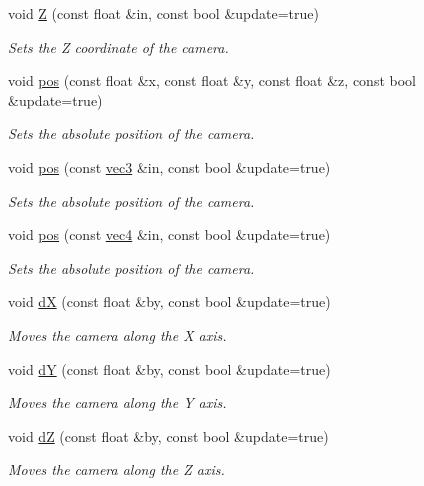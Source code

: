 \begin{DoxyCompactItemize}
void \hyperlink{class_camera_a38438f8e2417a3a40eaad85d2ab344a9}{\-Z} (const float \&in, const bool \&update=true)
\begin{DoxyCompactList}\small\item\em \-Sets the \-Z coordinate of the camera. \end{DoxyCompactList}\item 
void \hyperlink{class_camera_a432e03c15d63f8839fe4731016d907a4}{pos} (const float \&x, const float \&y, const float \&z, const bool \&update=true)
\begin{DoxyCompactList}\small\item\em \-Sets the absolute position of the camera. \end{DoxyCompactList}\item 
void \hyperlink{class_camera_ae9dc2206b71b25cf320a05d148cb8b56}{pos} (const \hyperlink{struct_angel_1_1vec3}{vec3} \&in, const bool \&update=true)
\begin{DoxyCompactList}\small\item\em \-Sets the absolute position of the camera. \end{DoxyCompactList}\item 
void \hyperlink{class_camera_aec2115038562e514193bb2b67f5da153}{pos} (const \hyperlink{struct_angel_1_1vec4}{vec4} \&in, const bool \&update=true)
\begin{DoxyCompactList}\small\item\em \-Sets the absolute position of the camera. \end{DoxyCompactList}\item 
void \hyperlink{class_camera_ac7985a6cb48f4e1e74fda17e5213dd74}{d\-X} (const float \&by, const bool \&update=true)
\begin{DoxyCompactList}\small\item\em \-Moves the camera along the \-X axis. \end{DoxyCompactList}\item 
void \hyperlink{class_camera_a59570a88e3ff2d277c9e995372fcadfe}{d\-Y} (const float \&by, const bool \&update=true)
\begin{DoxyCompactList}\small\item\em \-Moves the camera along the \-Y axis. \end{DoxyCompactList}\item 
void \hyperlink{class_camera_ab94ed9b3c7e12f484d6bfa5f827b59ff}{d\-Z} (const float \&by, const bool \&update=true)
\begin{DoxyCompactList}\small\item\em \-Moves the camera along the \-Z axis. \end{DoxyCompactList}\item 

\end{DoxyCompactItemize}
